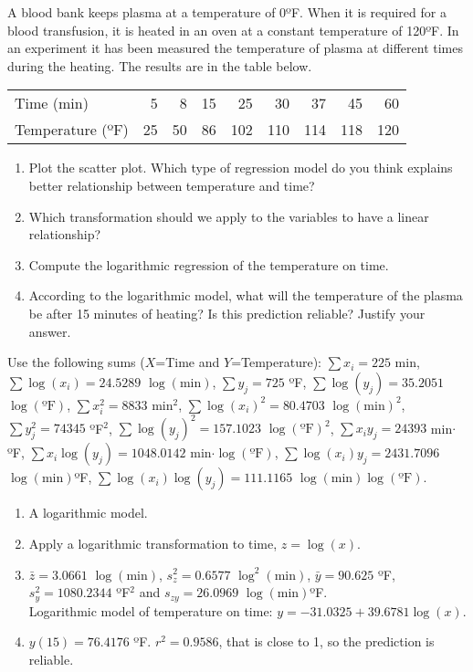 {A blood bank keeps plasma at a temperature of 0ºF.
When it is required for a blood transfusion, it is heated in an oven at a constant temperature of 120ºF.
In an experiment it has been measured the temperature of plasma at different times during the heating.
The results are in the table below.
\begin{center}
\begin{tabular}{lrrrrrrrr}
\toprule
Time (min)	& 5 & 8 & 15 & 25 & 30 & 37 & 45 & 60\\
Temperature (ºF) & 25 & 50 & 86 & 102 & 110 & 114 & 118 & 120\\
\bottomrule
\end{tabular}
\end{center}
\begin{enumerate}
\item Plot the scatter plot.
Which type of regression model do you think explains better relationship between temperature and time?
\item Which transformation should we apply to the variables to have a linear relationship?
\item Compute the logarithmic regression of the temperature on time.
\item According to the logarithmic model, what will the temperature of the plasma be after 15 minutes of heating?
Is this prediction reliable? Justify your answer.
\end{enumerate}

Use the following sums ($X$=Time and $Y$=Temperature): $\sum x_i=225$ min, $\sum \log(x_i)=24.5289$ $\log(\mbox{min})$, $\sum y_j=725$ ºF, $\sum \log(y_j)=35.2051$ $\log(\mbox{ºF})$, $\sum x_i^2=8833$ min$^2$, $\sum \log(x_i)^2=80.4703$ $\log(\mbox{min})^2$, $\sum y_j^2=74345$ ºF$^2$, $\sum \log(y_j)^2=157.1023$ $\log(\mbox{ºF})^2$, $\sum x_iy_j=24393$ min$\cdot$ºF, $\sum x_i\log(y_j)=1048.0142$ min$\cdot \log(\mbox{ºF})$, $\sum \log(x_i)y_j=2431.7096$ $\log(\mbox{min})$ºF, $\sum \log(x_i)\log(y_j)=111.1165$ $\log(\mbox{min})\log(\mbox{ºF})$.
}
{
\begin{enumerate}
\item A logarithmic model.
\item Apply a logarithmic transformation to time, $z=\log(x)$.
\item $\bar z=3.0661$ $\log(\mbox{min})$, $s_z^2=0.6577$ $\log^2(\mbox{min})$, $\bar y=90.625$ ºF, $s_y^2=1080.2344$ ºF$^2$ and $s_{zy}=26.0969$ $\log(\mbox{min})$ºF.\\
Logarithmic model of temperature on time: $y=-31.0325+39.6781\log(x)$.
\item $y(15)=76.4176$ ºF. $r^2=0.9586$, that is close to 1, so the prediction is reliable.
\end{enumerate}
}
{}


